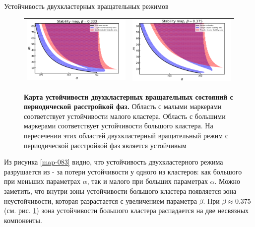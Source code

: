 \begin{chapter}{Устойчивость двухкластерных вращательных режимов}
	\begin{figure}[h!]\center
		\begin{tabular}{cc}
		\includegraphics[width=0.5\columnwidth]{pictures/map-0-33.png}
		&
		\includegraphics[width=0.5\columnwidth]{pictures/map-0-375.png}
		\end{tabular}
		\caption{\textbf{Карта устойчивости двухкластерных вращательных состояний с периодической расстройкой фаз.}
		Область с малыми маркерами соответствует устойчивости малого кластера.
		Область с большими маркерами соответствует устойчивости большого кластера.
		На пересечении этих областей двухкластерный вращательный режим с периодической расстройкой фаз является устойчивым}
		\label{map-0375}
	\end{figure}

	Из рисунка \ref{map-083} видно, что устойчивость двухкластерного режима разрушается из - за потери устойчивости у одного из кластеров:
	как большого при меньших параметрах $\alpha$, так и малого при больших параметрах $\alpha$.
	Можно заметить, что внутри зоны устойчивости большого кластера появляется зона неустойчивости, которая
	разрастается с увеличением параметра $\beta$. При $\beta \approx 0.375$ (см. рис. \ref{map-0375}) зона устойчивости большого кластера
	распадается на две несвязных компоненты.


\end{chapter}
